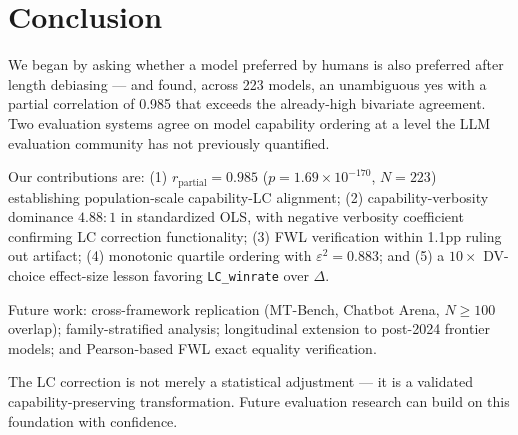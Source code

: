 \section{Conclusion}
\label{sec:conclusion}

We began by asking whether a model preferred by humans is also preferred after length debiasing
--- and found, across 223 models, an unambiguous yes with a partial correlation of 0.985 that
exceeds the already-high bivariate agreement. Two evaluation systems agree on model capability
ordering at a level the LLM evaluation community has not previously quantified.

Our contributions are: (1) $r_{\mathrm{partial}} = 0.985$ ($p = 1.69 \times 10^{-170}$,
$N=223$) establishing population-scale capability-LC alignment; (2) capability-verbosity
dominance $4.88{:}1$ in standardized OLS, with negative verbosity coefficient confirming LC
correction functionality; (3) FWL verification within 1.1pp ruling out artifact; (4) monotonic
quartile ordering with $\varepsilon^2 = 0.883$; and (5) a $10\times$ DV-choice effect-size
lesson favoring \texttt{LC\_winrate} over $\Delta$.

Future work: cross-framework replication (MT-Bench, Chatbot Arena, $N \geq 100$ overlap);
family-stratified analysis; longitudinal extension to post-2024 frontier models; and
Pearson-based FWL exact equality verification.

The LC correction is not merely a statistical adjustment --- it is a validated
capability-preserving transformation. Future evaluation research can build on this foundation
with confidence.
